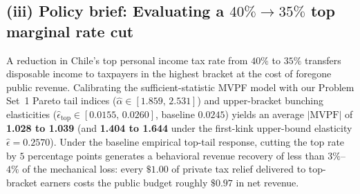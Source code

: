 \subsection*{(iii) Policy brief: Evaluating a $40\% \to 35\%$ top marginal rate cut}

A reduction in Chile's top personal income tax rate from $40\%$ to $35\%$ transfers disposable income to taxpayers in the highest bracket at the cost of foregone public revenue. Calibrating the sufficient-statistic MVPF model with our Problem Set~1 Pareto tail indices ($\hat{\alpha} \in [1.859,\, 2.531]$) and upper-bracket bunching elasticities ($\hat{\epsilon}_{\mathrm{top}} \in [0.0155,\, 0.0260]$, baseline $0.0245$) yields an average $|\mathrm{MVPF}|$ of \textbf{1.028 to 1.039} (and \textbf{1.404 to 1.644} under the first-kink upper-bound elasticity $\hat{\epsilon} = 0.2570$). Under the baseline empirical top-tail response, cutting the top rate by $5$ percentage points generates a behavioral revenue recovery of less than $3\%$--$4\%$ of the mechanical loss: every $\$1.00$ of private tax relief delivered to top-bracket earners costs the public budget roughly $\$0.97$ in net revenue.


